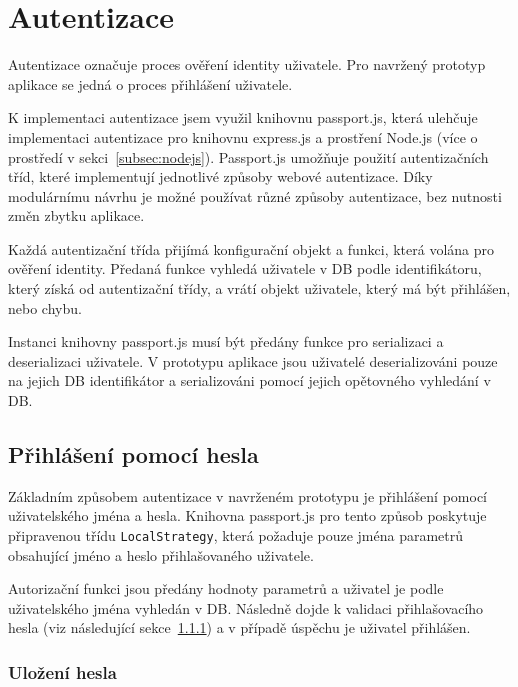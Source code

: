 
\section{Autentizace}\label{sec:autentizace}

Autentizace označuje proces ověření identity uživatele.
Pro navržený prototyp aplikace se jedná o proces přihlášení uživatele.

K implementaci autentizace jsem využil knihovnu passport.js, která ulehčuje implementaci autentizace pro knihovnu express.js a prostření Node.js (více o prostředí v sekci~\ref{subsec:nodejs}).
Passport.js umožňuje použití autentizačních tříd, které implementují jednotlivé způsoby webové autentizace.
Díky modulárnímu návrhu je možné používat různé způsoby autentizace, bez nutnosti změn zbytku aplikace.

Každá autentizační třída přijímá konfigurační objekt a funkci, která volána pro ověření identity.
Předaná funkce vyhledá uživatele v DB podle identifikátoru, který získá od autentizační třídy, a vrátí objekt uživatele, který má být přihlášen, nebo chybu.

Instanci knihovny passport.js musí být předány funkce pro serializaci a deserializaci uživatele.
V prototypu aplikace jsou uživatelé deserializováni pouze na jejich DB identifikátor a serializováni pomocí jejich opětovného vyhledání v DB.

\subsection{Přihlášení pomocí hesla}\label{subsec:přihlášeníPomocíHesla}

Základním způsobem autentizace v navrženém prototypu je přihlášení pomocí uživatelského jména a hesla.
Knihovna passport.js pro tento způsob poskytuje připravenou třídu \texttt{LocalStrategy}, která požaduje pouze jména parametrů obsahující jméno a heslo přihlašovaného uživatele.

Autorizační funkci jsou předány hodnoty parametrů a uživatel je podle uživatelského jména vyhledán v DB.
Následně dojde k validaci přihlašovacího hesla (viz následující sekce~\ref{subsubsec:uloženíHesla}) a v případě úspěchu je uživatel přihlášen.

\subsubsection{Uložení hesla}\label{subsubsec:uloženíHesla}

